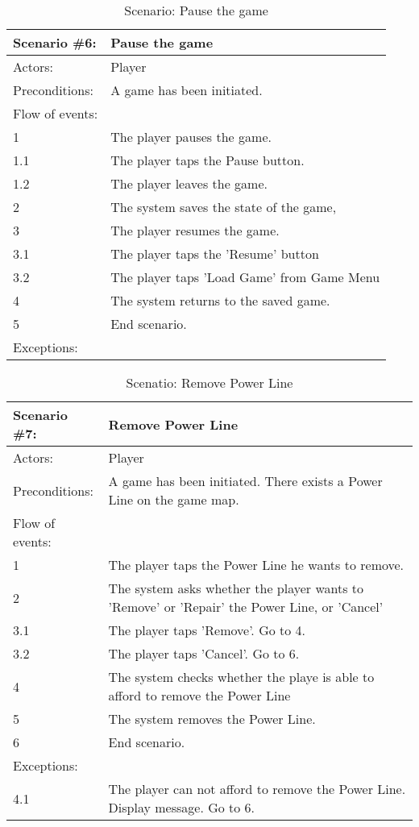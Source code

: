 \begin{table}
	\begin{tabular}{| l | p{10cm} |}
		\hline
		\rowcolor{lightgray}
		{\bf Scenario \#6:} & {\bf Pause the game} \\ \hline
		Actors: & Player \\ \hline
		Preconditions: & A game has been initiated. \\ \hline
		\rowcolor{lightergray}
		Flow of events: & \\ \hline
		1 & The player pauses the game. \\ \hline
		1.1 & The player taps the Pause button. \\ \hline
		1.2 & The player leaves the game. \\ \hline
		2 & The system saves the state of the game, \\ \hline
		3 & The player resumes the game. \\ \hline
		3.1 & The player taps the 'Resume' button \\ \hline
		3.2 & The player taps 'Load Game' from Game Menu \\ \hline
		4 & The system returns to the saved game. \\ \hline
		5 & End scenario. \\ \hline
		\rowcolor{lightergray}
		Exceptions: & \\ \hline
	\end{tabular}
	\caption{Scenario: Pause the game}
\end{table}

\begin{table}
	\begin{tabular}{| l | p{10cm} |}
		\hline
		\rowcolor{lightgray}
		{\bf Scenario \#7:} & {\bf Remove Power Line} \\ \hline
		Actors: & Player \\ \hline
		Preconditions: & A game has been initiated. There exists a Power Line on the game map. \\ \hline
		\rowcolor{lightergray}		
		Flow of events: & \\ \hline
		1 & The player taps the Power Line he wants to remove. \\ \hline
		2 & The system asks whether the player wants to 'Remove' or 'Repair' the Power Line, or 'Cancel' \\ \hline
		3.1 & The player taps 'Remove'. Go to 4. \\ \hline
		3.2 & The player taps 'Cancel'. Go to 6. \\ \hline
		4 & The system checks whether the playe is able to afford to remove the Power Line \\ \hline
		5 & The system removes the Power Line. \\ \hline
		6 & End scenario. \\ \hline
		\rowcolor{lightergray}
		Exceptions: & \\ \hline
		4.1 & The player can not afford to remove the Power Line. Display message. Go to 6. \\ \hline
	\end{tabular}
	\caption{Scenatio: Remove Power Line}
\end{table}

